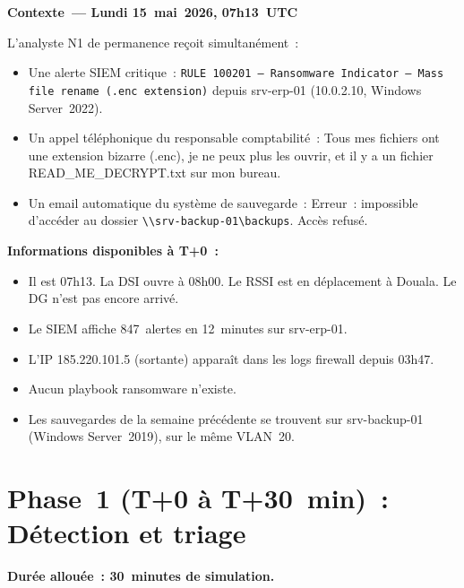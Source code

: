 \begin{boxalert}
\textbf{Contexte~— Lundi 15~mai~2026, 07h13~UTC}

L'analyste N1 de permanence reçoit simultanément~:

\begin{itemize}
  \item Une alerte SIEM critique~: \texttt{RULE 100201 — Ransomware
        Indicator — Mass file rename (.enc extension)} depuis
        srv-erp-01 (10.0.2.10, Windows Server~2022).
  \item Un appel téléphonique du responsable comptabilité~:
        \og{}Tous mes fichiers ont une extension bizarre (.enc),
        je ne peux plus les ouvrir, et il y a un fichier
        READ\_ME\_DECRYPT.txt sur mon bureau.\fg{}
  \item Un email automatique du système de sauvegarde~:
        \og{}Erreur~: impossible d'accéder au dossier
        \texttt{\textbackslash\textbackslash srv-backup-01\textbackslash backups}.
        Accès refusé.\fg{}
\end{itemize}

\textbf{Informations disponibles à T+0~:}
\begin{itemize}
  \item Il est 07h13. La DSI ouvre à 08h00. Le RSSI est en déplacement
        à Douala. Le DG n'est pas encore arrivé.
  \item Le SIEM affiche 847~alertes en 12~minutes sur srv-erp-01.
  \item L'IP 185.220.101.5 (sortante) apparaît dans les logs
        firewall depuis 03h47.
  \item Aucun playbook ransomware n'existe.
  \item Les sauvegardes de la semaine précédente se trouvent sur
        srv-backup-01 (Windows Server~2019), sur le même VLAN~20.
\end{itemize}
\end{boxalert}


\section{Phase~1 (T+0 à T+30~min)~: Détection et triage}
\label{lab3:phase1}

\textbf{Durée allouée~: 30~minutes de simulation.}

